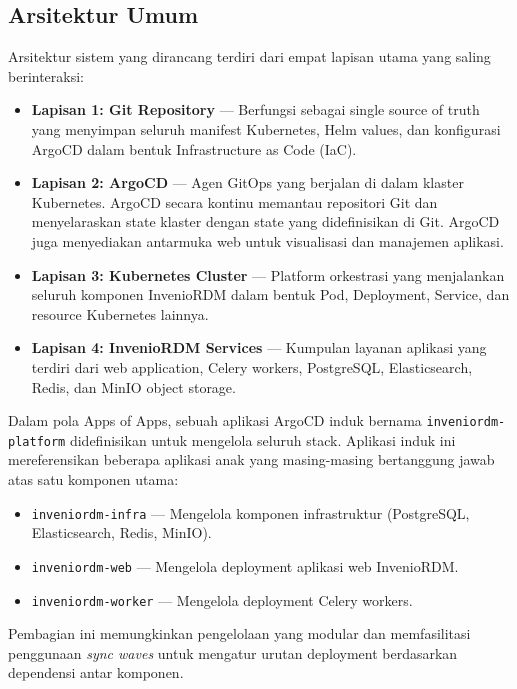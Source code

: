 \subsection{Arsitektur Umum}

Arsitektur sistem yang dirancang terdiri dari empat lapisan utama yang saling berinteraksi:

\begin{itemize}
    \item \textbf{Lapisan 1: Git Repository} --- Berfungsi sebagai single source of truth yang menyimpan seluruh manifest Kubernetes, Helm values, dan konfigurasi ArgoCD dalam bentuk Infrastructure as Code (IaC).
    
    \item \textbf{Lapisan 2: ArgoCD} --- Agen GitOps yang berjalan di dalam klaster Kubernetes. ArgoCD secara kontinu memantau repositori Git dan menyelaraskan state klaster dengan state yang didefinisikan di Git. ArgoCD juga menyediakan antarmuka web untuk visualisasi dan manajemen aplikasi.
    
    \item \textbf{Lapisan 3: Kubernetes Cluster} --- Platform orkestrasi yang menjalankan seluruh komponen InvenioRDM dalam bentuk Pod, Deployment, Service, dan resource Kubernetes lainnya.
    
    \item \textbf{Lapisan 4: InvenioRDM Services} --- Kumpulan layanan aplikasi yang terdiri dari web application, Celery workers, PostgreSQL, Elasticsearch, Redis, dan MinIO object storage.
\end{itemize}

Dalam pola Apps of Apps, sebuah aplikasi ArgoCD induk bernama \texttt{inveniordm-platform} didefinisikan untuk mengelola seluruh stack. Aplikasi induk ini mereferensikan beberapa aplikasi anak yang masing-masing bertanggung jawab atas satu komponen utama:

\begin{itemize}
    \item \texttt{inveniordm-infra} --- Mengelola komponen infrastruktur (PostgreSQL, Elasticsearch, Redis, MinIO).
    \item \texttt{inveniordm-web} --- Mengelola deployment aplikasi web InvenioRDM.
    \item \texttt{inveniordm-worker} --- Mengelola deployment Celery workers.
\end{itemize}

Pembagian ini memungkinkan pengelolaan yang modular dan memfasilitasi penggunaan \textit{sync waves} untuk mengatur urutan deployment berdasarkan dependensi antar komponen.

